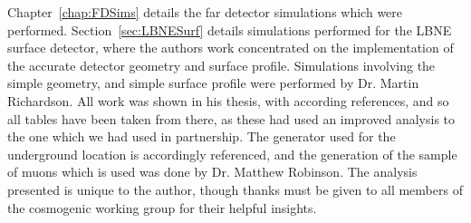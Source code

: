 \begin{declaration}
  Chapter~\ref{chap:FDSims} details the far detector simulations which were performed. Section~\ref{sec:LBNESurf} details simulations performed for the LBNE surface detector, where the authors work concentrated on the implementation of the accurate detector geometry and surface profile. Simulations involving the simple geometry, and simple surface profile were performed by Dr. Martin Richardson. All work was shown in his thesis, with according references, and so all tables have been taken from there, as these had used an improved analysis to the one which we had used in partnership. The generator used for the underground location is accordingly referenced, and the generation of the sample of muons which is used was done by Dr. Matthew Robinson. The analysis presented is unique to the author, though thanks must be given to all members of the cosmogenic working group for their helpful insights. \\
  

\end{declaration}

